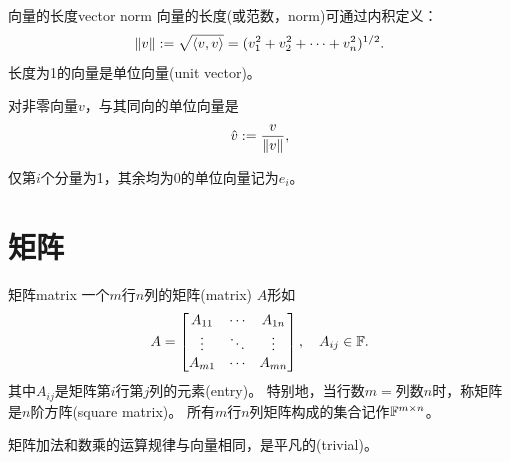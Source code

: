 \begin{definition}{向量的长度}{vector norm}
	向量的长度(或范数，norm)可通过内积定义：
	\begin{equation}
		\lVert v\rVert := \sqrt{\langle v,v\rangle} = (v_1^2 + v_2^2 + \cdots + v_n^2)^{1/2}.
	\end{equation}
	长度为1的向量是单位向量(unit vector)。
\end{definition}
\begin{corollary}
	对非零向量$v$，与其同向的单位向量是
	\begin{equation}
		\hat v := \frac{v}{\lVert v\rVert},
	\end{equation}
\end{corollary}
\begin{remark}
	仅第$i$个分量为1，其余均为0的单位向量记为$e_i$。
\end{remark}


\section{矩阵}
\begin{definition}{矩阵}{matrix}
    一个$m$行$n$列的矩阵(matrix) $A$形如
    \[
        A = \begin{bmatrix}
            A_{11}&\cdots&A_{1n}\\
            \vdots&\ddots&\vdots\\
            A_{m1}&\cdots&A_{mn}
        \end{bmatrix},\quad A_{ij} \in \mathbb{F}.
    \]
    其中$A_{ij}$是矩阵第$i$行第$j$列的元素(entry)。
	特别地，当行数$m =$列数$n$时，称矩阵是$n$阶方阵(square matrix)。
    \tcblower
	所有$m$行$n$列矩阵构成的集合记作$\mathbb{F}^{m\times n}$。
\end{definition}

矩阵加法和数乘的运算规律与向量相同，是平凡的(trivial)。

